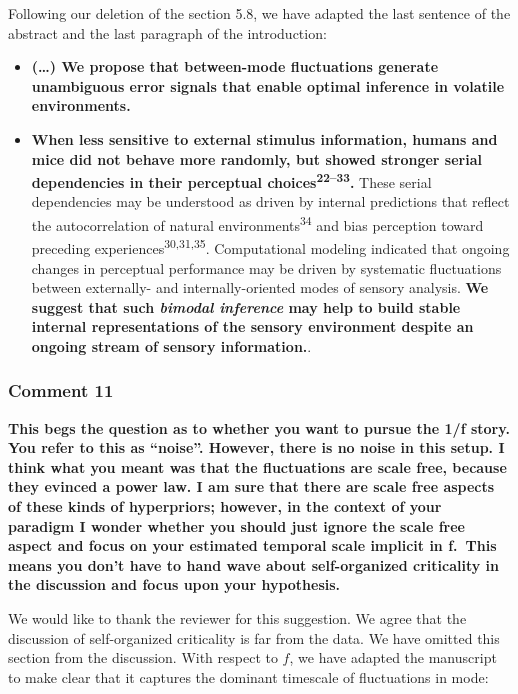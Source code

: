 \documentclass[
]{article}
\begin{document}
Following our deletion of the section 5.8, we have adapted the last
sentence of the abstract and the last paragraph of the introduction:

\begin{itemize}
\item
  \textbf{(\ldots) We propose that between-mode fluctuations generate
  unambiguous error signals that enable optimal inference in volatile
  environments.}
\item
  \textbf{When less sensitive to external stimulus information, humans
  and mice did not behave more randomly, but showed stronger serial
  dependencies in their perceptual choices\textsuperscript{22--33}.}
  These serial dependencies may be understood as driven by internal
  predictions that reflect the autocorrelation of natural
  environments\textsuperscript{34} and bias perception toward preceding
  experiences\textsuperscript{30,31,35}. Computational modeling
  indicated that ongoing changes in perceptual performance may be driven
  by systematic fluctuations between externally- and internally-oriented
  modes of sensory analysis. \textbf{We suggest that such \emph{bimodal
  inference} may help to build stable internal representations of the
  sensory environment despite an ongoing stream of sensory
  information.}.
\end{itemize}

\hypertarget{comment-11}{%
\subsubsection{Comment 11}\label{comment-11}}

\textbf{This begs the question as to whether you want to pursue the 1/f
story. You refer to this as ``noise''. However, there is no noise in
this setup. I think what you meant was that the fluctuations are scale
free, because they evinced a power law. I am sure that there are scale
free aspects of these kinds of hyperpriors; however, in the context of
your paradigm I wonder whether you should just ignore the scale free
aspect and focus on your estimated temporal scale implicit in f.~This
means you don't have to hand wave about self-organized criticality in
the discussion and focus upon your hypothesis.}

We would like to thank the reviewer for this suggestion. We agree that
the discussion of self-organized criticality is far from the data. We
have omitted this section from the discussion. With respect to \(f\), we
have adapted the manuscript to make clear that it captures the dominant
timescale of fluctuations in mode:
\end{document}
